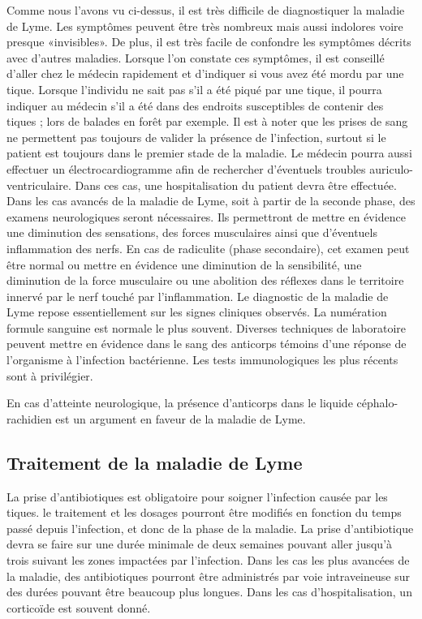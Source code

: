 \documentclass[12pt,a4wide]{article}
\begin{document}
Comme nous l'avons vu ci-dessus, il est très difficile de diagnostiquer la maladie de Lyme. Les symptômes peuvent être très nombreux mais aussi indolores voire presque «invisibles». De plus, il est très facile de confondre les symptômes décrits avec d'autres maladies. Lorsque l'on constate ces symptômes, il est conseillé d'aller chez le médecin rapidement et d'indiquer si vous avez été mordu par une tique. Lorsque l'individu ne sait pas s'il a été piqué par une tique, il pourra indiquer au médecin s'il a été dans des endroits susceptibles de contenir des tiques ; lors de balades en forêt par exemple. 
 Il est à noter que les prises de sang ne permettent pas toujours de valider la présence de l'infection, surtout si le patient est toujours dans le premier stade de la maladie. Le médecin pourra aussi effectuer un électrocardiogramme afin de rechercher d'éventuels troubles auriculo-ventriculaire. Dans ces cas, une hospitalisation du patient devra être effectuée.
Dans les cas avancés de la maladie de Lyme, soit à partir de la seconde phase, des examens neurologiques seront nécessaires. Ils permettront de mettre en évidence une diminution des sensations, des forces musculaires ainsi que d'éventuels inflammation des nerfs. En cas de radiculite (phase secondaire), cet examen peut être normal ou mettre en évidence une diminution de la sensibilité, une diminution de la force musculaire ou une abolition des réflexes dans le territoire innervé par le nerf touché par l'inflammation.
Le diagnostic de la maladie de Lyme repose essentiellement sur les signes cliniques observés.
La numération formule sanguine est normale le plus souvent.
Diverses techniques de laboratoire peuvent mettre en évidence dans le sang des anticorps témoins d'une réponse de l'organisme à l'infection bactérienne. Les tests immunologiques les plus récents sont à privilégier.

En cas d'atteinte neurologique, la présence d'anticorps dans le liquide céphalo-rachidien est un argument en faveur de la maladie de Lyme.


\subsection{Traitement de la maladie de Lyme}
\label{sec-3-5}

La prise d'antibiotiques est obligatoire pour soigner l'infection causée par les tiques. le traitement et les dosages pourront être modifiés en fonction du temps passé depuis l'infection, et donc de la phase de la maladie. La prise d'antibiotique devra se faire sur une durée minimale de deux semaines pouvant aller jusqu'à trois suivant les zones impactées par l'infection.
Dans les cas les plus avancées de la maladie, des antibiotiques pourront être
administrés par voie intraveineuse sur des durées pouvant être beaucoup plus
longues. Dans les cas d'hospitalisation, un corticoïde est souvent donné. 
\end{document}
